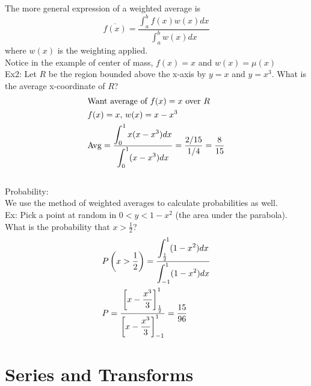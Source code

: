 \documentclass[11pt, fleqn]{article}
\begin{document}
The more general expression of a weighted average is
$$\overline{f(x)}=\frac{\displaystyle{\int_a^bf(x)w(x)dx}}{\displaystyle{\int_a^bw(x)dx}}$$
where $w(x)$ is the weighting applied.\\
Notice in the example of center of mass, $f(x)=x$ and $w(x)=\mu(x)$\\
Ex2: Let $R$ be the region bounded above the x-axis by $y=x$ and $y=x^3$. What is the average x-coordinate of $R$?
\begin{align*}
    &\text{Want average of $f(x)=x$ over $R$}\\
    &f(x)=x,\,w(x)=x-x^3\\
    &\mathrm{Avg}=\frac{\displaystyle\int_0^1x(x-x^3)dx}{\displaystyle\int_0^1(x-x^3)dx}=\frac{2/15}{1/4}=\frac{8}{15}
\end{align*}
\\
Probability:\\
We use the method of weighted averages to calculate probabilities as well.\\
Ex: Pick a point at random in $0<y<1-x^2$ (the area under the parabola). What is the probability that $x>\frac{1}{2}$?
\begin{align*}
    &P\left( x>\frac{1}{2} \right)=\frac{\displaystyle{\int_{\frac{1}{2}}^1(1-x^2)dx}}{\displaystyle{\int_{-1}^1(1-x^2)dx}}\\
    &P=\frac{\displaystyle\left[ x-\frac{x^3}{3} \right]_{\frac{1}{2}}^1}{\displaystyle\left[ x-\frac{x^3}{3} \right]_{-1}^1}=\frac{15}{96}
\end{align*}








































\section{Series and Transforms}
\end{document}
